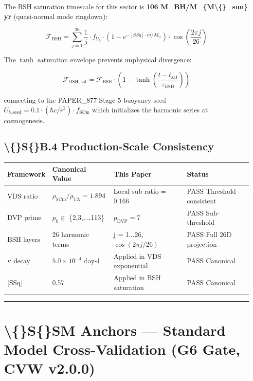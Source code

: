 \documentclass[11pt]{article}
\begin{document}
The BSH saturation timescale for this sector is \textbf{106 M\_BH/M\_\{M\textbackslash\{\}\_sun\} yr} (quasi-normal mode ringdown):

$$\mathcal{F}_{\mathrm{BSH}} = \sum_{j=1}^{26} \frac{1}{j} \cdot f_U_b \cdot \left(1 - e^{-[SSq] \cdot m/M_\odot}\right) \cdot \cos\!\left(\frac{2\pi j}{26}\right)$$

The $\tanh$ saturation envelope prevents unphysical divergence:

$$\mathcal{F}_{\mathrm{BSH,sat}} = \mathcal{F}_{\mathrm{BSH}} \cdot \left(1 - \tanh\!\left(\frac{t - t_{\mathrm{sat}}}{\tau_{\mathrm{BSH}}}\right)\right)$$

connecting to the PAPER\_877 Stage 5 buoyancy seed $U_{b,\mathrm{seed}} = 0.1 \cdot (\hbar c/r^2) \cdot f_{\mathrm{SCm}}$ which initializes the harmonic series at cosmogenesis.

\subsection*{\textbackslash\{\}S\{\}B.4 Production-Scale Consistency}

\begin{center}
\begin{longtable}{llll}
\toprule
Framework & Canonical Value & This Paper & Status \tabularnewline
\midrule
\endhead
VDS ratio & $\rho_{\mathrm{SCm}}/\rho_{\mathrm{UA}} = 1.894$ & Local sub-ratio = 0.166 & PASS Threshold-consistent \tabularnewline
DVP prime & $p_k \in$ \{2,3,...,113\} & $p_{\mathrm{DVP}} = 7$ & PASS Sub-threshold \tabularnewline
BSH layers & 26 harmonic terms & j = 1...26, $\cos(2\pi j/26)$ & PASS Full 26D projection \tabularnewline
$\kappa$ decay & $5.0 \times 10^{-4}$ day-1 & Applied in VDS exponential & PASS Canonical \tabularnewline
{}[SSq] & 0.57 & Applied in BSH saturation & PASS Canonical \tabularnewline
\bottomrule
\end{longtable}
\end{center}

\noindent\rule{\textwidth}{0.4pt}

\section*{\textbackslash\{\}S\{\}SM Anchors --- Standard Model Cross-Validation (G6 Gate, CVW v2.0.0)}
\end{document}
